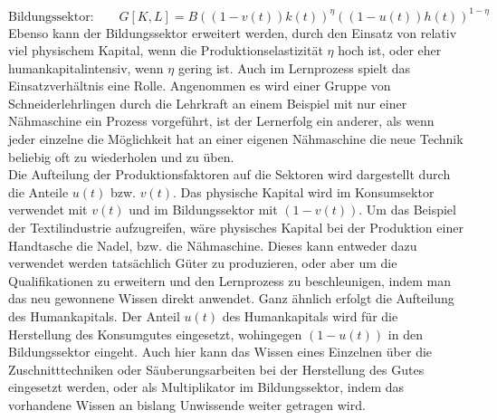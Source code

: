 \begin{equation}
\text{Bildungssektor:} \qquad G[K,L]= B((1-v(t))k(t))^{\eta}((1-u(t))h(t))^{1-\eta}
\label{eq:ProduktionsfunktionH}
\end{equation}
Ebenso kann der Bildungssektor erweitert werden, durch den Einsatz von relativ viel physischem Kapital, wenn die Produktionselastizität $\eta$ hoch ist, oder eher humankapitalintensiv, wenn $\eta$ gering ist. Auch im Lernprozess spielt das Einsatzverhältnis eine Rolle. Angenommen es wird einer Gruppe von Schneiderlehrlingen durch die Lehrkraft an einem Beispiel mit nur einer Nähmaschine ein Prozess vorgeführt, ist der Lernerfolg ein anderer, als wenn jeder einzelne die Möglichkeit hat an einer eigenen Nähmaschine die neue Technik beliebig oft zu wiederholen und zu üben.  \\
Die Aufteilung der Produktionsfaktoren auf die Sektoren wird dargestellt durch die Anteile $u(t)$ bzw. $v(t)$. Das physische Kapital wird im Konsumsektor verwendet mit $v(t)$ und im Bildungssektor mit $(1-v(t))$. Um das Beispiel der Textilindustrie aufzugreifen, wäre physisches Kapital bei der Produktion einer Handtasche die Nadel, bzw. die Nähmaschine. Dieses kann entweder dazu verwendet werden tatsächlich Güter zu produzieren, oder aber um die Qualifikationen zu erweitern und den Lernprozess zu beschleunigen, indem man das neu gewonnene Wissen direkt anwendet. Ganz ähnlich erfolgt die Aufteilung des Humankapitals. Der Anteil $u(t)$ des Humankapitals wird für die Herstellung des Konsumgutes eingesetzt, wohingegen $(1-u(t))$  in den Bildungssektor eingeht. Auch hier kann das Wissen eines Einzelnen über die Zuschnitttechniken oder Säuberungsarbeiten  bei der Herstellung des Gutes eingesetzt werden, oder als Multiplikator im Bildungssektor, indem das vorhandene Wissen an bislang Unwissende weiter getragen wird.
